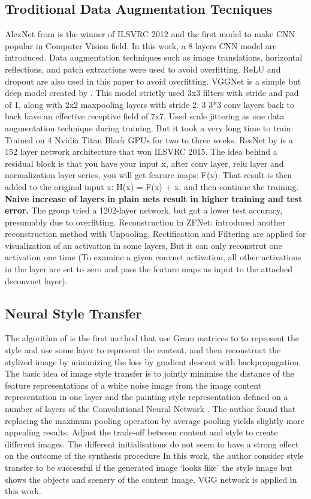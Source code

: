 \documentclass[a4paper,11pt]{article}
\begin{document}
\subsection{Troditional Data Augmentation Tecniques}
AlexNet from \cite{krizhevsky2012imagenet} is the winner of ILSVRC 2012 and the first model to make CNN popular in Computer Vision field. In this work, a 8 layers CNN model are introduced. Data augmentation techniques such as image translations, horizontal reflections, and patch extractions were used to avoid overfitting. ReLU and dropout are also used in this paper to avoid overfitting.
VGGNet is a simple but deep model created by \cite{simonyan2014very}. This model strictly used 3x3 filters with stride and pad of 1, along with 2x2 maxpooling layers with stride 2. 3 3*3 conv layers back to back have an effective receptive field of 7x7. Used scale jittering as one data augmentation technique during training. But it took a very long time to train: Trained on 4 Nvidia Titan Black GPUs for two to three weeks.
ResNet by \cite{he2016deep} is a 152 layer network architecture that won ILSVRC 2015. The idea behind a residual block is that you have your input x, after conv layer, relu layer and normalization layer series, you will get fearure maps: F(x). That result is then added to the original input x: H(x) = F(x) + x, and then continue the training. \textbf{Naive increase of layers in plain nets result in higher training and test error.} The group tried a 1202-layer network, but got a lower test accuracy, presumably due to overfitting.
Reconstruction in ZFNet: \cite{zeiler2014visualizing} introduced another reconstruction method with Unpooling, Rectification and Filtering are applied for visualization of an activation in some layers, But it can only reconstrut one activation one time (To examine a given convnet activation, all other activations in the layer are set to zero and pass the feature maps as input to the attached deconvnet layer).

\subsection{Neural Style Transfer}
The algorithm of \cite{gatys2016image} is the first method that use Gram matrices to to represent the style and use some layer to represent the content, and then reconstruct the stylized image by minimizing the loss by gradient descent with backpropagation. The basic idea of image style transfer is to jointly minimise the distance of the feature representations of a white noise image from the image content representation in one layer and the painting style representation defined on a number of layers of the Convolutional Neural Network . The author found that replacing the maximum pooling operation by average pooling yields slightly more appealing results. Adjust the trade-off between content and style to create different images. The different initialisations do not seem to have a strong effect on the outcome of the synthesis procedure In this work, the author consider style transfer to be successful if the generated image ‘looks like’ the style image but shows the objects and scenery of the content image. VGG network is applied in this work.
\end{document}
